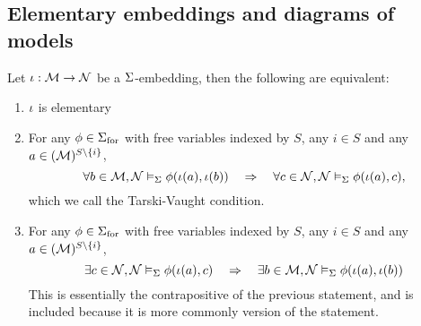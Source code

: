 \subsection{Elementary embeddings and diagrams of models}
\begin{prop}
    Let $\iota : \mathcal{M} \to \mathcal{N}$ be a $\Sigma$-embedding, 
    then the following are equivalent:
    \begin{enumerate}
        \item $\iota$ is elementary 
        \item For any 
            $\phi \in {\Sigma}_\mathrm{for}$ with free variables indexed by $S$,
            any $i \in S$ 
            and any $a \in ({\mathcal{M}})^{S \setminus \left\{i\right\}}$,
            \[\forall b \in {\mathcal{M}}, \mathcal{N} \vDash_{\Sigma} \phi(\iota(a),\iota(b)) 
            \quad \Rightarrow \quad 
            \forall c \in {\mathcal{N}}, \mathcal{N} \vDash_{\Sigma} \phi(\iota(a),c),\]
            which we call the Tarski-Vaught condition.
        \item For any 
            $\phi \in {\Sigma}_\mathrm{for}$ with free variables indexed by $S$,
            any $i \in S$ 
            and any $a \in ({\mathcal{M}})^{S \setminus \left\{i\right\}}$,
            \[\exists c \in {\mathcal{N}}, \mathcal{N} \vDash_{\Sigma} \phi(\iota(a),c)
            \quad \Rightarrow \quad
            \exists b \in {\mathcal{M}}, \mathcal{N} \vDash_{\Sigma} \phi(\iota(a),\iota(b))\]
            This is essentially the contrapositive of the previous statement,
            and is included because it is more commonly 
            version of the statement.
    \end{enumerate}
\end{prop}
